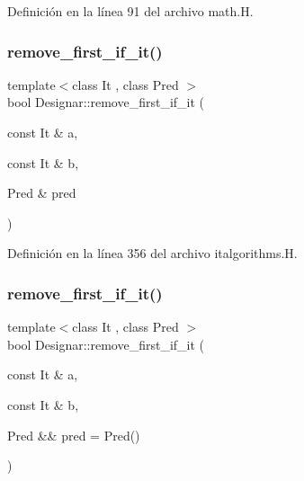 Definición en la línea 91 del archivo math.\+H.

\mbox{\label{namespace_designar_ab732236488ace0492a1cf5fd7ce9add9}} 
\subsubsection{\texorpdfstring{remove\+\_\+first\+\_\+if\+\_\+it()}{remove\_first\_if\_it()}\hspace{0.1cm}{\footnotesize\ttfamily [1/2]}}
{\footnotesize\ttfamily template$<$class It , class Pred $>$ \\
bool Designar\+::remove\+\_\+first\+\_\+if\+\_\+it (\begin{DoxyParamCaption}\item[{const It \&}]{a,  }\item[{const It \&}]{b,  }\item[{Pred \&}]{pred }\end{DoxyParamCaption})}



Definición en la línea 356 del archivo italgorithms.\+H.

\mbox{\label{namespace_designar_aaee4724db923890d1f8a85009922805f}} 
\subsubsection{\texorpdfstring{remove\+\_\+first\+\_\+if\+\_\+it()}{remove\_first\_if\_it()}\hspace{0.1cm}{\footnotesize\ttfamily [2/2]}}
{\footnotesize\ttfamily template$<$class It , class Pred $>$ \\
bool Designar\+::remove\+\_\+first\+\_\+if\+\_\+it (\begin{DoxyParamCaption}\item[{const It \&}]{a,  }\item[{const It \&}]{b,  }\item[{Pred \&\&}]{pred = {\ttfamily Pred()} }\end{DoxyParamCaption})}



